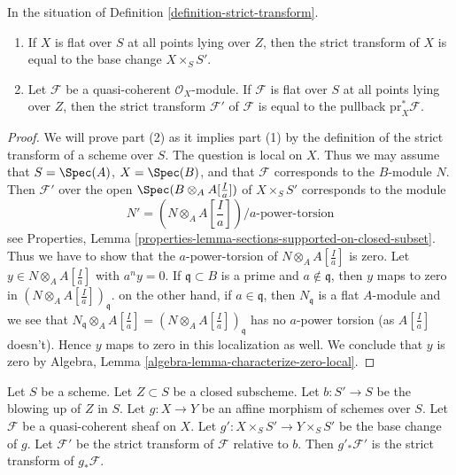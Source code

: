 \begin{lemma}
\label{lemma-strict-transform-flat}
In the situation of Definition \ref{definition-strict-transform}.
\begin{enumerate}
\item If $X$ is flat over $S$ at all points lying over $Z$, then
the strict transform of $X$ is equal to the base change $X \times_S S'$.
\item Let $\mathcal{F}$ be a quasi-coherent $\mathcal{O}_X$-module.
If $\mathcal{F}$ is flat over $S$ at all points lying over $Z$, then
the strict transform $\mathcal{F}'$ of $\mathcal{F}$ is equal to the
pullback $\text{pr}_X^*\mathcal{F}$.
\end{enumerate}
\end{lemma}

\begin{proof}
We will prove part (2) as it implies part (1) by the definition of the
strict transform of a scheme over $S$. The question is local on $X$.
Thus we may assume that $S = \Spec(A)$, $X = \Spec(B)$, and that
$\mathcal{F}$ corresponds to the $B$-module $N$. Then $\mathcal{F}'$
over the open $\Spec(B \otimes_A A[\frac{I}{a}])$ of $X \times_S S'$
corresponds to the module
$$
N' = (N \otimes_A A[\textstyle{\frac{I}{a}}])/a\text{-power-torsion}
$$
see Properties, Lemma
\ref{properties-lemma-sections-supported-on-closed-subset}.
Thus we have to show that the $a$-power-torsion of
$N \otimes_A A[\frac{I}{a}]$ is zero. Let $y \in N \otimes_A A[\frac{I}{a}]$
with $a^n y = 0$. If $\mathfrak q \subset B$
is a prime and $a \not \in \mathfrak q$, then $y$ maps to
zero in $(N \otimes_A A[\frac{I}{a}])_\mathfrak q$. on the other hand,
if $a \in \mathfrak q$, then $N_\mathfrak q$ is a flat $A$-module
and we see that
$N_\mathfrak q \otimes_A A[\frac{I}{a}]
=(N \otimes_A A[\frac{I}{a}])_\mathfrak q$
has no $a$-power torsion (as $A[\frac{I}{a}]$ doesn't).
Hence $y$ maps to zero in this localization as well. We conclude that
$y$ is zero by
Algebra, Lemma \ref{algebra-lemma-characterize-zero-local}.
\end{proof}

\begin{lemma}
\label{lemma-strict-transform-affine}
Let $S$ be a scheme. Let $Z \subset S$ be a closed subscheme.
Let $b : S' \to S$ be the blowing up of $Z$ in $S$. Let
$g : X \to Y$ be an affine morphism of schemes over $S$.
Let $\mathcal{F}$ be a quasi-coherent sheaf on $X$.
Let $g' : X \times_S S' \to Y \times_S S'$ be the base change
of $g$. Let $\mathcal{F}'$ be the strict transform of $\mathcal{F}$
relative to $b$. Then $g'_*\mathcal{F}'$ is the strict transform
of $g_*\mathcal{F}$.
\end{lemma}

